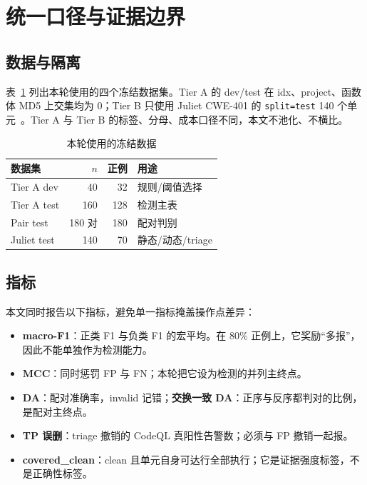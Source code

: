 \documentclass[conference]{IEEEtran}
\begin{document}
\section{统一口径与证据边界}
\label{sec:protocol}

\subsection{数据与隔离}

表~\ref{tab:data} 列出本轮使用的四个冻结数据集。Tier A 的 dev/test 在 idx、project、函数体 MD5 上交集均为 0；Tier B 只使用 Juliet CWE-401 的 \texttt{split=test} 140 个单元~\cite{boland2012juliet,sard,mitrecwe401}。Tier A 与 Tier B 的标签、分母、成本口径不同，本文不池化、不横比。

\begin{table}[t]
\centering
\caption{本轮使用的冻结数据}
\label{tab:data}
\footnotesize
\setlength{\tabcolsep}{3pt}
\begin{tabular}{@{}lrrl@{}}
\toprule
数据集 & $n$ & 正例 & 用途 \\
\midrule
Tier A dev & 40 & 32 & 规则/阈值选择 \\
Tier A test & 160 & 128 & 检测主表 \\
Pair test & 180 对 & 180 & 配对判别 \\
Juliet test & 140 & 70 & 静态/动态/triage \\
\bottomrule
\end{tabular}
\end{table}

\subsection{指标}

本文同时报告以下指标，避免单一指标掩盖操作点差异：
\begin{itemize}
  \item \textbf{macro-F1}：正类 F1 与负类 F1 的宏平均。在 80\% 正例上，它奖励“多报”，因此不能单独作为检测能力。
  \item \textbf{MCC}：同时惩罚 FP 与 FN；本轮把它设为检测的并列主终点。
  \item \textbf{DA}：配对准确率，invalid 记错；\textbf{交换一致 DA}：正序与反序都判对的比例，是配对主终点。
  \item \textbf{TP 误删}：triage 撤销的 CodeQL 真阳性告警数；必须与 FP 撤销一起报。
  \item \textbf{covered\_clean}：clean 且单元自身可达行全部执行；它是证据强度标签，不是正确性标签。
\end{itemize}
\end{document}
